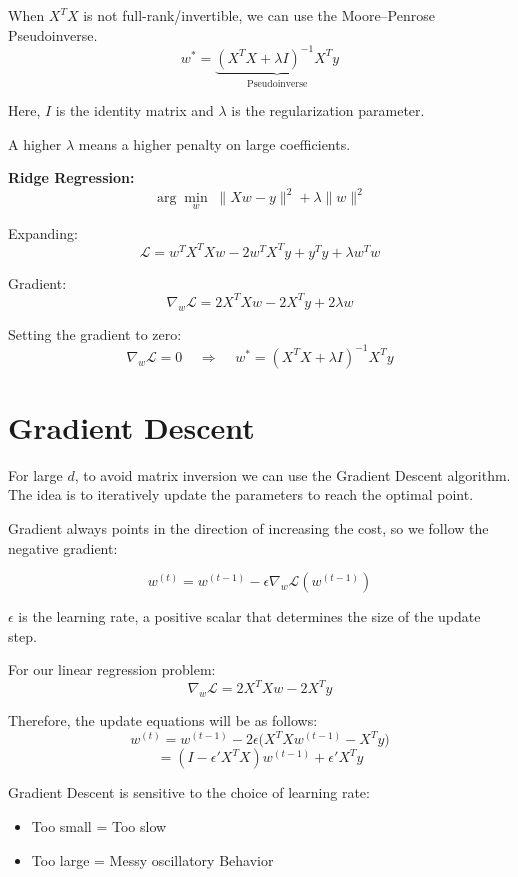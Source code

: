 \documentclass[11pt]{article}
\begin{document}
When $X^T X$ is not full-rank/invertible, we can use the Moore--Penrose Pseudoinverse.
\[
	w^* = \underbrace{(X^T X + \lambda I)^{-1} X^T y}_{\text{Pseudoinverse}}
\]

Here, $I$ is the identity matrix and $\lambda$ is the regularization parameter.

A higher $\lambda$ means a higher penalty on large coefficients.

\bigskip

\textbf{Ridge Regression:}
\[
	\arg\min_w \; \|Xw - y\|^2 + \lambda \|w\|^2
\]

Expanding:
\[
	\mathcal{L} = w^T X^T X w - 2 w^T X^T y + y^T y + \lambda w^T w
\]

Gradient:
\[
	\nabla_w \mathcal{L} = 2X^T X w - 2X^T y + 2\lambda w
\]

Setting the gradient to zero:
\[
	\nabla_w \mathcal{L} = 0 \;\;\;\;\Rightarrow\;\;\;\; w^* = (X^T X + \lambda I)^{-1} X^T y
\]

\section*{Gradient Descent}


For large $d$, to avoid matrix inversion we can use the Gradient Descent algorithm.
The idea is to iteratively update the parameters to reach the optimal point.

\medskip

\noindent Gradient always points in the direction of increasing the cost, so we follow the negative gradient:

\[
	w^{(t)} = w^{(t-1)} - \epsilon \nabla_w \mathcal{L}(w^{(t-1)})
\]

$\epsilon$ is the learning rate, a positive scalar that determines the size of the update step.

\pagebreak

For our linear regression problem:
\[
	\nabla_w \mathcal{L} = 2X^T X w - 2X^T y
\]

Therefore, the update equations will be as follows:
\[
	w^{(t)} = w^{(t-1)} - 2\epsilon \big(X^T X w^{(t-1)} - X^T y\big)
\]
\[
	= (I - \epsilon' X^T X) w^{(t-1)} + \epsilon' X^T y
\]

Gradient Descent is sensitive to the choice of learning rate:
\begin{itemize}
	\item Too small = Too slow
	\item Too large = Messy oscillatory Behavior
\end{itemize}
\end{document}
